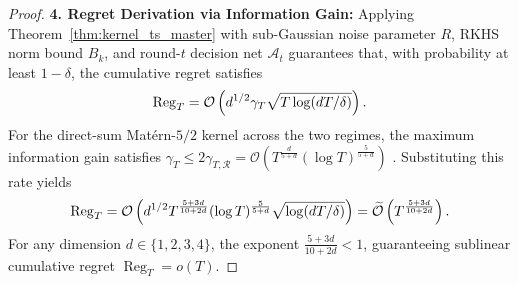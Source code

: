 \begin{proof}
\noindent\textbf{4. Regret Derivation via Information Gain:} 
Applying Theorem~\ref{thm:kernel_ts_master} with sub-Gaussian noise parameter $R$, RKHS norm bound $B_k$, and round-$t$ decision net $\mathcal{A}_t$ guarantees that, with probability at least $1 - \delta$, the cumulative regret satisfies
\begin{equation*}
    \operatorname{Reg}_T = \mathcal{O}\left( d^{1/2} \gamma_T \sqrt{T \log(dT/\delta)} \right).
\end{equation*}
For the direct-sum Matérn-$5/2$ kernel across the two regimes, the maximum information gain satisfies $\gamma_T \le 2\gamma_{T, \mathcal{R}} = \mathcal{O}\left(T^{\frac{d}{5+d}} (\log T)^{\frac{5}{5+d}}\right)$ \citep[Table 1]{vakili2021information}. Substituting this rate yields
\begin{equation*}
    \operatorname{Reg}_T = \mathcal{O}\left( d^{1/2} T^{\frac{5+3d}{10+2d}} (\log T)^{\frac{5}{5+d}} \sqrt{\log(dT/\delta)} \right) = \widetilde{\mathcal{O}}\left( T^{\frac{5+3d}{10+2d}} \right).
\end{equation*}
For any dimension $d \in \{1, 2, 3, 4\}$, the exponent $\frac{5+3d}{10+2d} < 1$, guaranteeing sublinear cumulative regret $\operatorname{Reg}_T = o(T)$.
\end{proof}


